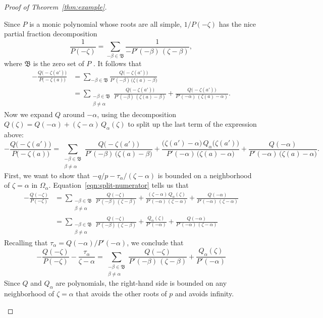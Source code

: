 \documentclass{article}
\theoremstyle{definition}
\theoremstyle{plain}
\newcommand{\roots}{\mathfrak{B}}
\newcommand{\domain}{\Omega}
\begin{document}
\begin{proof}[Proof of Theorem~\ref{thm:example}]
\begin{itemize}
Since $P$ is a monic polynomial whose roots are all simple, $1/P(-\zeta)$ has the nice partial fraction decomposition
\[ \frac{1}{P(-\zeta)} = \sum_{-\beta \in \roots} \frac{1}{-P'(-\beta)\,(\zeta - \beta)}, \]
where $\roots$ is the zero set of $P$ \cite[Section 1.4, Exercise~2]{ahlfors}. 
It follows that
\begin{align*}
-\frac{Q\big(-\zeta(a')\big)}{P\big(-\zeta(a)\big)} & = \sum_{-\beta \in \roots} \frac{Q\big(-\zeta(a')\big)}{P'(-\beta)\,\big(\zeta(a) - \beta\big)} \\
& = \sum_{\substack{-\beta \in \roots \\ \beta \neq \alpha}} \frac{Q\big(-\zeta(a')\big)}{P'(-\beta)\,(\zeta(a) - \beta)} + \frac{Q\big(-\zeta(a')\big)}{P'(-\alpha)\,(\zeta(a) - \alpha)}.
\end{align*}
Now we expand $Q$ around $-\alpha$, using the decomposition $Q(\zeta) = Q(-\alpha)+(\zeta-\alpha)\,Q_\alpha(\zeta)$ to split up the last term of the expression above:
\begin{equation}\label{eqn:split-numerator}
-\frac{Q\big(-\zeta(a')\big)}{P\big(-\zeta(a)\big)} = \sum_{\substack{-\beta \in \roots \\ \beta \neq \alpha}} \frac{Q\big(-\zeta(a')\big)}{P'(-\beta)\,\big(\zeta(a) - \beta\big)} + \frac{\big(\zeta(a') - \alpha\big)\,Q_\alpha\big(\zeta(a')\big)}{P'(-\alpha)\,\big(\zeta(a) - \alpha\big)} + \frac{Q(-\alpha)}{P'(-\alpha)\,\big(\zeta(a) - \alpha\big)}.
\end{equation}
First, we want to show that $-q/p-\tau_\alpha/(\zeta-\alpha)$ is bounded on a neighborhood of $\zeta = \alpha$ in $\domain_\alpha$. Equation~\eqref{eqn:split-numerator} tells us that
\begin{align*}
-\frac{Q(-\zeta)}{P(-\zeta)} & =
\sum_{\substack{-\beta \in \roots \\ \beta \neq \alpha}} \frac{Q(-\zeta)}{P'(-\beta)\,(\zeta - \beta)} + \frac{(\zeta - \alpha)\,Q_\alpha(\zeta)}{P'(-\alpha)\,(\zeta - \alpha)} + \frac{Q(-\alpha)}{P'(-\alpha)\,(\zeta - \alpha)} \\
&=\sum_{\substack{-\beta \in \roots \\ \beta \neq \alpha}} \frac{Q(-\zeta)}{P'(-\beta)\,(\zeta - \beta)} + \frac{Q_\alpha(\zeta)}{P'(-\alpha)} + \frac{Q(-\alpha)}{P'(-\alpha)\,(\zeta - \alpha)}
\end{align*}
Recalling that $\tau_\alpha = Q(-\alpha)/P'(-\alpha)$, we conclude that
\[-\frac{Q(-\zeta)}{P(-\zeta)}-\frac{\tau_\alpha}{\zeta-\alpha}=\sum_{\substack{-\beta \in \roots \\ \beta \neq \alpha}} \frac{Q(-\zeta)}{P'(-\beta)\,(\zeta - \beta)} + \frac{Q_\alpha(\zeta)}{P'(-\alpha)}\]
Since $Q$ and $Q_\alpha$ are polynomials, the right-hand side is bounded on any neighborhood of $\zeta = \alpha$ that avoids the other roots of $p$ and avoids infinity.


\end{itemize}
\end{proof}
\end{document}
